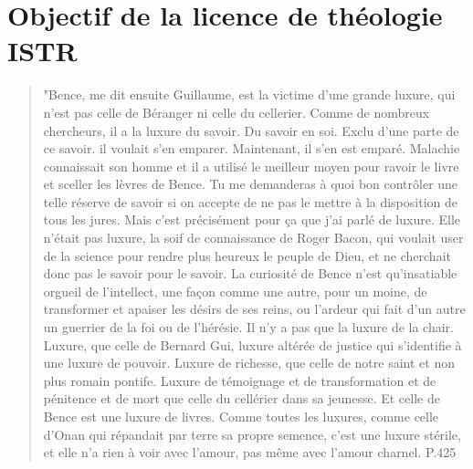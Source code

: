\chapter{Objectif de la licence de théologie ISTR}



\begin{quote}

"Bence, me dit ensuite Guillaume, est la victime d'une grande luxure, qui n'est pas celle de Béranger ni celle du cellerier. Comme de nombreux chercheurs, il a la luxure du savoir. Du savoir en soi. 
Exclu d'une parte de ce savoir. il
voulait s'en emparer. Maintenant, il s'en est emparé. Malachie connaissait son homme et il a utilisé le meilleur moyen
pour ravoir le livre et sceller les lèvres de Bence. Tu me
demanderas à quoi bon contrôler une telle réserve de savoir
si on accepte de ne pas le mettre à la disposition de tous les
jures. Mais c'est précisément pour ça que j'ai parlé de
luxure. Elle n'était pas luxure, la soif de connaissance de
Roger Bacon, qui voulait user de la science pour rendre plus
heureux le peuple de Dieu, et ne cherchait donc pas le savoir
pour le savoir. La curiosité de Bence n'est qu'insatiable
orgueil de l'intellect, une façon comme une autre, pour un
moine, de transformer et apaiser les désirs de ses reins, ou
l'ardeur qui fait d'un autre un guerrier de la foi ou de l'hérésie. Il n'y a pas que la luxure de la chair. Luxure, que celle de
Bernard Gui, luxure altérée de justice qui s'identifie à une
luxure de pouvoir. Luxure de richesse, que celle de notre
saint et non plus romain pontife. Luxure de témoignage et de
transformation et de pénitence et de mort que celle du cellérier dans sa jeunesse. 
Et celle de Bence est une luxure de
livres. Comme toutes les luxures, comme celle d'Onan qui
répandait par terre sa propre semence, c'est une luxure stérile, et elle n'a rien à voir avec l'amour, pas même avec
l'amour charnel. \cite{Eco:NomRose} P.425
\end{quote}
